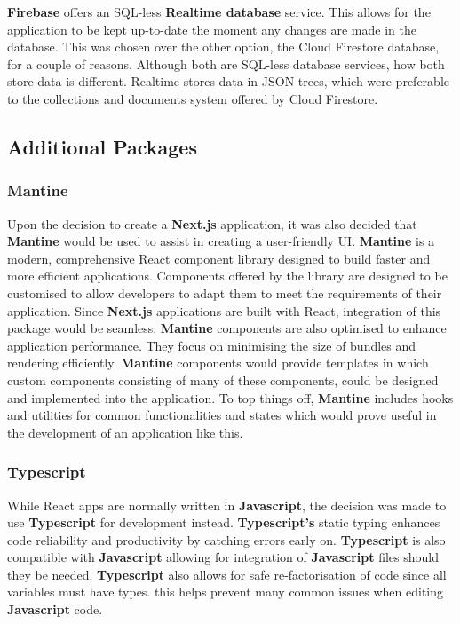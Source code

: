 \documentclass{l4proj}
\begin{document}
\textbf{Firebase} offers an SQL-less \textbf{Realtime database} service. This allows for the application to be kept up-to-date the moment any changes are made in the database. This was chosen over the other option,  the Cloud Firestore database,  for a couple of reasons. Although both are SQL-less database services,  how both store data is different. Realtime stores data in JSON trees,  which were preferable to the collections and documents system offered by Cloud Firestore.

\subsection{Additional Packages}
\subsubsection{Mantine}
Upon the decision to create a \textbf{Next.js} application,  it was also decided that \textbf{Mantine} would be used to assist in creating a user-friendly UI. \textbf{Mantine} is a modern,  comprehensive React component library designed to build faster and more efficient applications. Components offered by the library are designed to be customised to allow developers to adapt them to meet the requirements of their application. Since \textbf{Next.js} applications are built with React,  integration of this package would be seamless. \textbf{Mantine} components are also optimised to enhance application performance. They focus on minimising the size of bundles and rendering efficiently. \textbf{Mantine} components would provide templates in which custom components consisting of many of these components,  could be designed and implemented into the application. To top things off,  \textbf{Mantine} includes hooks and utilities for common functionalities and states which would prove useful in the development of an application like this.

\subsubsection{Typescript}
While React apps are normally written in \textbf{Javascript},  the decision was made to use \textbf{Typescript} for development instead. \textbf{Typescript's} static typing enhances code reliability and productivity by catching errors early on. \textbf{Typescript} is also compatible with \textbf{Javascript} allowing for integration of \textbf{Javascript} files should they be needed. \textbf{Typescript} also allows for safe re-factorisation of code since all variables must have types. this helps prevent many common issues when editing \textbf{Javascript} code.
\end{document}
